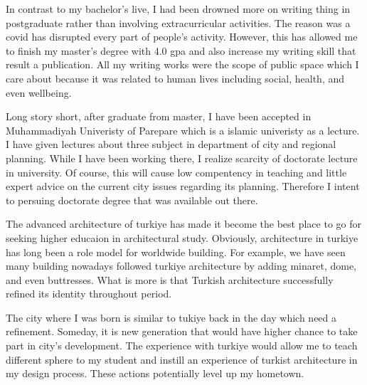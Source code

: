 \documentclass[../main.tex]{subfiles}
\begin{document}
In contrast to my bachelor's live, I had been drowned more on writing thing in postgraduate rather than involving extracurricular activities. The reason was a covid has disrupted every part of people's activity. However, this has allowed me to finish my master's degree with 4.0 gpa and also increase my writing skill that result a publication. All my writing works were the scope of public space which I care about because it was related to human lives including social, health, and even wellbeing.

Long story short, after graduate from master, I have been accepted in Muhammadiyah Univeristy of Parepare which is a islamic univeristy as a lecture. I have given lectures about three subject in department of city and regional planning. While I have been working there, I realize scarcity of doctorate lecture in university. Of course, this will cause low compentency in teaching and little expert advice on the current city issues regarding its planning. Therefore I intent to persuing doctorate degree that was available out there.

The advanced architecture of turkiye has made it become the best place to go for seeking higher educaion in architectural study. Obviously, architecture in turkiye has long been a role model for worldwide building. For example, we have seen many building nowadays followed turkiye architecture by adding minaret, dome, and even buttresses. What is more is that Turkish architecture successfully refined its identity throughout period.

The city where I was born is similar to tukiye back in the day which need a refinement. Someday, it is new generation that would have higher chance to take part in city's development. The experience with turkiye would allow me to teach different sphere to my student and instill an experience of turkist architecture in my design process. These actions potentially level up my hometown.



%

%
\end{document}
